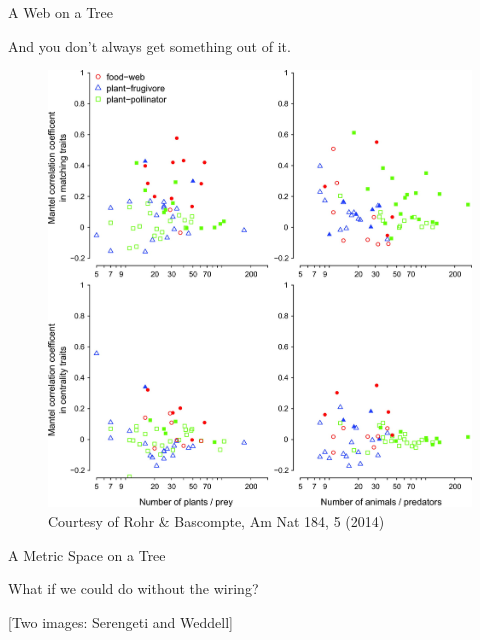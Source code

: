 \documentclass[ignorenonframetext,]{beamer}
\begin{document}
\begin{frame}{A Web on a Tree}

And you don't always get something out of it.

\begin{figure}
\centering
\includegraphics[height=0.5 \textheight]{images/rohr.jpg}
\caption{Courtesy of Rohr \& Bascompte, Am Nat 184, 5 (2014)}
\end{figure}

\end{frame}


\begin{frame}{A Metric Space on a Tree}

What if we could do without the wiring?

{[}Two images: Serengeti and Weddell{]}

\end{frame}
\end{document}
